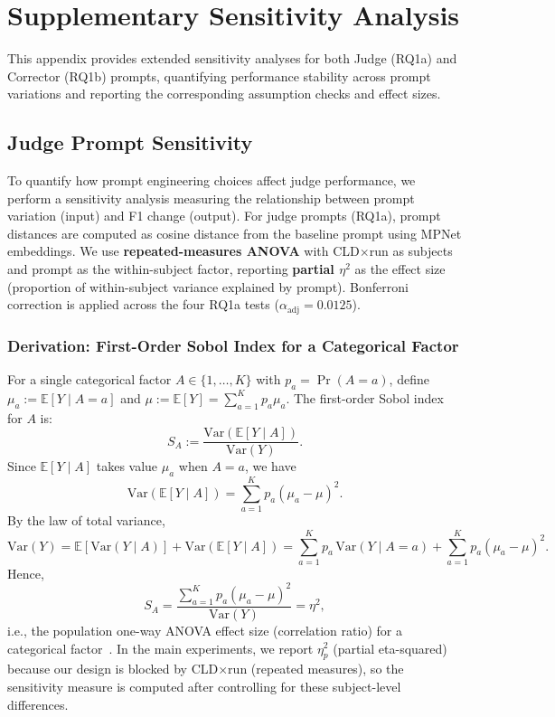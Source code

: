\documentclass[class=Thesis]{standalone}
\begin{document}
\chapter{Supplementary Sensitivity Analysis}
\label{app:sensitivity_analysis}

This appendix provides extended sensitivity analyses for both Judge (RQ1a) and Corrector (RQ1b) prompts, quantifying performance stability across prompt variations and reporting the corresponding assumption checks and effect sizes.

\section{Judge Prompt Sensitivity}
\label{app:judge_sensitivity}

To quantify how prompt engineering choices affect judge performance, we perform a sensitivity analysis measuring the relationship between prompt variation (input) and F1 change (output). For judge prompts (RQ1a), prompt distances are computed as cosine distance from the baseline prompt using MPNet embeddings. We use \textbf{repeated-measures ANOVA} with CLD$\times$run as subjects and prompt as the within-subject factor, reporting \textbf{partial $\eta^2$} as the effect size (proportion of within-subject variance explained by prompt). Bonferroni correction is applied across the four RQ1a tests ($\alpha_{\text{adj}} = 0.0125$).

\subsection{Derivation: First-Order Sobol Index for a Categorical Factor}
\label{app:sobol_eta2_derivation}

For a single categorical factor $A \in \{1,\dots,K\}$ with $p_a = \Pr(A=a)$, define $\mu_a := \mathbb{E}[Y \mid A=a]$ and $\mu := \mathbb{E}[Y] = \sum_{a=1}^K p_a \mu_a$. The first-order Sobol index for $A$ is:
\begin{equation}
S_A := \frac{\mathrm{Var}(\mathbb{E}[Y \mid A])}{\mathrm{Var}(Y)}.
\end{equation}
Since $\mathbb{E}[Y \mid A]$ takes value $\mu_a$ when $A=a$, we have
\begin{equation}
\mathrm{Var}(\mathbb{E}[Y \mid A]) = \sum_{a=1}^K p_a(\mu_a - \mu)^2.
\end{equation}
By the law of total variance,
\begin{equation}
\mathrm{Var}(Y) = \mathbb{E}[\mathrm{Var}(Y \mid A)] + \mathrm{Var}(\mathbb{E}[Y \mid A])
= \sum_{a=1}^K p_a\,\mathrm{Var}(Y \mid A=a) + \sum_{a=1}^K p_a(\mu_a - \mu)^2.
\end{equation}
Hence,
\begin{equation}
S_A = \frac{\sum_{a=1}^K p_a(\mu_a - \mu)^2}{\mathrm{Var}(Y)} = \eta^2,
\end{equation}
i.e., the population one-way ANOVA effect size (correlation ratio) for a categorical factor~\cite{saltelli2010variance}. In the main experiments, we report $\eta^2_p$ (partial eta-squared) because our design is blocked by CLD$\times$run (repeated measures), so the sensitivity measure is computed after controlling for these subject-level differences.
\end{document}
